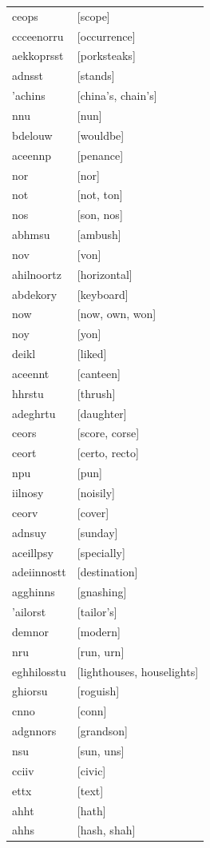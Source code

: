 \documentclass{article}
\begin{document}
\begin{tabular}{ll}
ceops & [scope] \\
ccceenorru & [occurrence] \\
aekkoprsst & [porksteaks] \\
adnsst & [stands] \\
'achins & [china's, chain's] \\
nnu & [nun] \\
bdelouw & [wouldbe] \\
aceennp & [penance] \\
nor & [nor] \\
not & [not, ton] \\
nos & [son, nos] \\
abhmsu & [ambush] \\
nov & [von] \\
ahilnoortz & [horizontal] \\
abdekory & [keyboard] \\
now & [now, own, won] \\
noy & [yon] \\
deikl & [liked] \\
aceennt & [canteen] \\
hhrstu & [thrush] \\
adeghrtu & [daughter] \\
ceors & [score, corse] \\
ceort & [certo, recto] \\
npu & [pun] \\
iilnosy & [noisily] \\
ceorv & [cover] \\
adnsuy & [sunday] \\
aceillpsy & [specially] \\
adeiinnostt & [destination] \\
agghinns & [gnashing] \\
'ailorst & [tailor's] \\
demnor & [modern] \\
nru & [run, urn] \\
eghhilosstu & [lighthouses, houselights] \\
ghiorsu & [roguish] \\
cnno & [conn] \\
adgnnors & [grandson] \\
nsu & [sun, uns] \\
cciiv & [civic] \\
ettx & [text] \\
ahht & [hath] \\
ahhs & [hash, shah] \\

\end{tabular}
\end{document}
